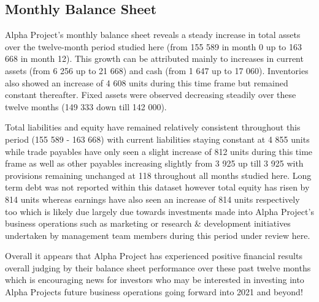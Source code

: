 

\subsection{Monthly Balance Sheet}\label{sec:title}

Alpha Project's monthly balance sheet reveals a steady increase in total assets over the twelve-month period studied here (from 155 589 in month 0 up to 163 668 in month 12). This growth can be attributed mainly to increases in current assets (from 6 256 up to 21 668) and cash (from 1 647 up to 17 060). Inventories also showed an increase of 4 608 units during this time frame but remained constant thereafter. Fixed assets were observed decreasing steadily over these twelve months (149 333 down till 142 000). 

Total liabilities and equity have remained relatively consistent throughout this period (155 589 - 163 668) with current liabilities staying constant at 4 855 units while trade payables have only seen a slight increase of 812 units during this time frame as well as other payables increasing slightly from 3 925 up till 3 925 with provisions remaining unchanged at 118 throughout all months studied here. Long term debt was not reported within this dataset however total equity has risen by 814 units whereas earnings have also seen an increase of 814 units respectively too which is likely due largely due towards investments made into Alpha Project's business operations such as marketing or research & development initiatives undertaken by management team members during this period under review here. 

Overall it appears that Alpha Project has experienced positive financial results overall judging by their balance sheet performance over these past twelve months which is encouraging news for investors who may be interested in investing into Alpha Projects future business operations going forward into 2021 and beyond!